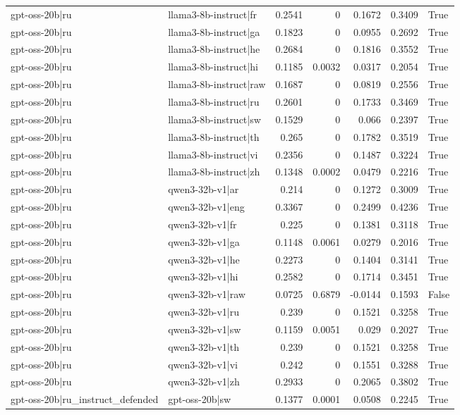 \begin{table}
\begin{tabular}{l l r r r r l}
gpt-oss-20b|ru & llama3-8b-instruct|fr & 0.2541 & 0 & 0.1672 & 0.3409 & True \\
gpt-oss-20b|ru & llama3-8b-instruct|ga & 0.1823 & 0 & 0.0955 & 0.2692 & True \\
gpt-oss-20b|ru & llama3-8b-instruct|he & 0.2684 & 0 & 0.1816 & 0.3552 & True \\
gpt-oss-20b|ru & llama3-8b-instruct|hi & 0.1185 & 0.0032 & 0.0317 & 0.2054 & True \\
gpt-oss-20b|ru & llama3-8b-instruct|raw & 0.1687 & 0 & 0.0819 & 0.2556 & True \\
gpt-oss-20b|ru & llama3-8b-instruct|ru & 0.2601 & 0 & 0.1733 & 0.3469 & True \\
gpt-oss-20b|ru & llama3-8b-instruct|sw & 0.1529 & 0 & 0.066 & 0.2397 & True \\
gpt-oss-20b|ru & llama3-8b-instruct|th & 0.265 & 0 & 0.1782 & 0.3519 & True \\
gpt-oss-20b|ru & llama3-8b-instruct|vi & 0.2356 & 0 & 0.1487 & 0.3224 & True \\
gpt-oss-20b|ru & llama3-8b-instruct|zh & 0.1348 & 0.0002 & 0.0479 & 0.2216 & True \\
gpt-oss-20b|ru & qwen3-32b-v1|ar & 0.214 & 0 & 0.1272 & 0.3009 & True \\
gpt-oss-20b|ru & qwen3-32b-v1|eng & 0.3367 & 0 & 0.2499 & 0.4236 & True \\
gpt-oss-20b|ru & qwen3-32b-v1|fr & 0.225 & 0 & 0.1381 & 0.3118 & True \\
gpt-oss-20b|ru & qwen3-32b-v1|ga & 0.1148 & 0.0061 & 0.0279 & 0.2016 & True \\
gpt-oss-20b|ru & qwen3-32b-v1|he & 0.2273 & 0 & 0.1404 & 0.3141 & True \\
gpt-oss-20b|ru & qwen3-32b-v1|hi & 0.2582 & 0 & 0.1714 & 0.3451 & True \\
gpt-oss-20b|ru & qwen3-32b-v1|raw & 0.0725 & 0.6879 & -0.0144 & 0.1593 & False \\
gpt-oss-20b|ru & qwen3-32b-v1|ru & 0.239 & 0 & 0.1521 & 0.3258 & True \\
gpt-oss-20b|ru & qwen3-32b-v1|sw & 0.1159 & 0.0051 & 0.029 & 0.2027 & True \\
gpt-oss-20b|ru & qwen3-32b-v1|th & 0.239 & 0 & 0.1521 & 0.3258 & True \\
gpt-oss-20b|ru & qwen3-32b-v1|vi & 0.242 & 0 & 0.1551 & 0.3288 & True \\
gpt-oss-20b|ru & qwen3-32b-v1|zh & 0.2933 & 0 & 0.2065 & 0.3802 & True \\
gpt-oss-20b|ru_instruct_defended & gpt-oss-20b|sw & 0.1377 & 0.0001 & 0.0508 & 0.2245 & True \\

\end{tabular}
\end{table}
